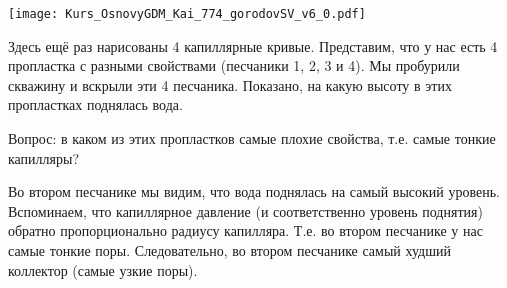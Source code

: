\texttt{[image: Kurs\_OsnovyGDM\_Kai\_774\_gorodovSV\_v6\_0.pdf]}

Здесь ещё раз нарисованы 4 капиллярные кривые.
Представим, что у нас есть 4 пропластка с разными свойствами (песчаники 1, 2, 3 и 4).
Мы пробурили скважину и вскрыли эти 4 песчаника.
Показано, на какую высоту в этих пропластках поднялась вода. 

Вопрос: в каком из этих пропластков самые плохие свойства, т.е. самые тонкие капилляры?

Во втором песчанике мы видим, что вода поднялась на самый высокий уровень. Вспоминаем, что капиллярное давление (и соответственно уровень поднятия) обратно пропорционально радиусу капилляра. Т.е. во втором песчанике у нас самые тонкие поры.
Следовательно, во втором песчанике самый худший коллектор (самые узкие поры).


